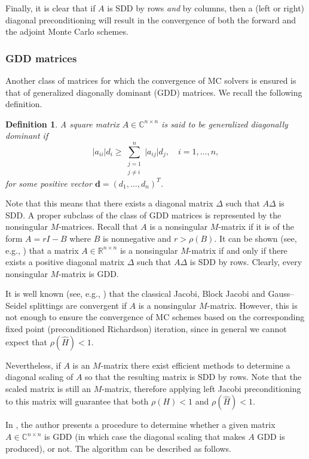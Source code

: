 \documentclass[final,leqno,onefignum,onetabnum]{siamltex1213}
\newtheorem{defn}{Definition}
\begin{document}
Finally, it is clear that if $A$ is SDD by rows {\em and} by columns, then 
a (left or right) diagonal preconditioning will result in the convergence
of both the forward and the adjoint Monte Carlo schemes.

\subsubsection{GDD matrices}
\label{sec:gdd}

Another class of matrices for which the convergence of
MC solvers is ensured is that of generalized diagonally
dominant (GDD) matrices. We recall the following definition.

\begin{defn}
A square matrix $A\in\mathbb{C}^{n\times n}$ is said to be {\em generalized
diagonally dominant} if
\[
 \lvert a_{ii}\rvert d_i \ge \sum_{\substack{j=1\\j\ne i}}^n \lvert
a_{ij}\rvert
d_j, \quad i=1,\ldots,n,
\]
for some positive vector $\mathbf{d}=(d_1,\ldots,d_n)^T$.
\end{defn}

Note that this means that there exists a diagonal matrix  $\Delta$
such that $A\Delta$ is SDD.
A proper subclass of the class of GDD matrices is represented
by the nonsingular $M$-matrices.
Recall that $A$ is a nonsingular $M$-matrix if it is of the form
$A=r I - B$ where $B$ is nonnegative and $r>\rho(B)$.
It can be shown (see, e.g., \cite{BP1979}) that  a matrix
$A\in\mathbb{R}^{n\times n}$ is a nonsingular $M$-matrix if and only
if there exists a positive diagonal matrix $\Delta$ such that
$A\Delta$ is SDD by rows. Clearly, every 
nonsingular $M$-matrix is GDD. 

It is well known (see, e.g., \cite{Ax1994}) that the classical
Jacobi, Block Jacobi and Gauss--Seidel splittings are
convergent if $A$ is a nonsingular $M$-matrix.
However, this is not enough to ensure the
convergence of MC schemes based on the corresponding fixed point
(preconditioned Richardson) iteration, since in general
we cannot expect that $\rho(\hat{H})<1$. 

Nevertheless, if $A$ is an $M$-matrix there exist efficient methods
to determine a diagonal scaling of $A$ so that the resulting matrix
is SDD by rows. Note that the scaled matrix is still an $M$-matrix, 
therefore applying left Jacobi preconditioning to this matrix will
guarantee that both $\rho(H)<1$ and $\rho(\hat{H})<1$.

In \cite{Li2002}, the author presents a procedure to determine
whether a given matrix $A\in\mathbb{C}^{n\times n}$
is GDD (in which case the diagonal scaling that
makes $A$ GDD is produced), or not.
The algorithm can be described as follows.
\end{document}
